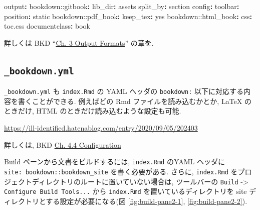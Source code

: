 \documentclass[
  xelatex,ja=standard,jafont=noto]{bxjsbook}
\newenvironment{Shaded}{\begin{snugshade}}{\end{snugshade}}
\newcommand{\AttributeTok}[1]{\textcolor[rgb]{0.77,0.63,0.00}{#1}}
\newcommand{\CharTok}[1]{\textcolor[rgb]{0.31,0.60,0.02}{#1}}
\newcommand{\FunctionTok}[1]{\textcolor[rgb]{0.00,0.00,0.00}{#1}}
\newcommand{\KeywordTok}[1]{\textcolor[rgb]{0.13,0.29,0.53}{\textbf{#1}}}
\theoremstyle{definition}
\theoremstyle{definition}
\theoremstyle{definition}
\theoremstyle{definition}
\theoremstyle{remark}
\begin{document}
\begin{Shaded}
\begin{Highlighting}[]
\FunctionTok{output}\KeywordTok{:}
\AttributeTok{  bookdown:}\FunctionTok{:gitbook}\KeywordTok{:}
\AttributeTok{    }\FunctionTok{lib\_dir}\KeywordTok{:}\AttributeTok{ assets}
\AttributeTok{    }\FunctionTok{split\_by}\KeywordTok{:}\AttributeTok{ section}
\AttributeTok{    }\FunctionTok{config}\KeywordTok{:}
\AttributeTok{      }\FunctionTok{toolbar}\KeywordTok{:}
\AttributeTok{        }\FunctionTok{position}\KeywordTok{:}\AttributeTok{ static}
\AttributeTok{  bookdown:}\FunctionTok{:pdf\_book}\KeywordTok{:}
\AttributeTok{    }\FunctionTok{keep\_tex}\KeywordTok{:}\AttributeTok{ }\CharTok{yes}
\AttributeTok{  bookdown:}\FunctionTok{:html\_book}\KeywordTok{:}
\AttributeTok{    }\FunctionTok{css}\KeywordTok{:}\AttributeTok{ toc.css}
\FunctionTok{documentclass}\KeywordTok{:}\AttributeTok{ book}
\end{Highlighting}
\end{Shaded}

詳しくは BKD
``\href{https://bookdown.org/yihui/bookdown/output-formats.html}{Ch. 3
Output Formats}'' の章を.

\hypertarget{bookdown.yml}{%
\subsection{\texorpdfstring{\texttt{\_bookdown.yml}}{\_bookdown.yml}}\label{bookdown.yml}}

\texttt{\_bookdown.yml} も \texttt{index.Rmd} の YAML ヘッダの
\texttt{bookdown:} 以下に対応する内容を書くことができる. 例えばどの Rmd
ファイルを読み込むかとか, LaTeX のときだけ, HTML
のときだけ読み込むような設定も可能.

\url{https://ill-identified.hatenablog.com/entry/2020/09/05/202403}

詳しくは, BKD
\href{https://bookdown.org/yihui/bookdown/configuration.html}{Ch. 4.4
Configuration}

Build ペーンから文書をビルドするには, \texttt{index.Rmd} のYAML ヘッダに
\texttt{site:\ bookdown::bookdown\_site} を書く必要がある. さらに,
\texttt{index.Rmd}
をプロジェクトディレクトリのルートに置いていない場合は, ツールバーの
\texttt{Build} -\textgreater{} \texttt{Configure\ Build\ Tools...} から
\texttt{index.Rmd} を置いているディレクトリを site
ディレクトリとする設定が必要になる(図 \ref{fig:build-pane2-1},
\ref{fig:build-pane2-2}).
\end{document}
